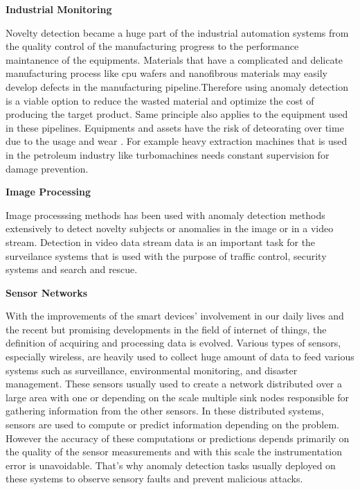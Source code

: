 \textbf{ Industrial Monitoring}

Novelty detection became a huge part of the industrial automation systems from the quality control
of the manufacturing progress to the performance maintanence of the equipments. Materials that have
a complicated and delicate manufacturing process like cpu wafers \cite{Kim:2012:MLN:2076800.2076903} and nanofibrous
materials \cite{Napoletano_2018} may easily develop defects in the manufacturing pipeline.Therefore using
anomaly detection is a viable option to reduce the wasted material and optimize the cost of
producing the target product. Same principle also applies to the equipment used in these pipelines.
Equipments and assets have the risk of deteorating over time due to the usage
and wear \cite{Pimentel:2014:RRN:2588908.2589196}. For example heavy extraction machines that is used in the
petroleum industry like turbomachines \cite{s150202774} needs constant supervision for damage
prevention. 

\textbf{ Image Processing}

Image processsing methods has been used with anomaly detection methods extensively to detect novelty
subjects or anomalies in the image or in a video stream. Detection in video data stream data is an
important task for the surveilance systems that is used with the purpose of traffic control,
security systems and search and rescue. \cite{image_anomaly} 

\textbf{ Sensor Networks}

With the improvements of the smart devices' involvement in our daily lives and the recent but promising developments
in the field of internet of things, the definition of acquiring and processing data is evolved.
Various types of sensors, especially wireless, are heavily used to collect huge amount of data to
feed various systems such as surveillance, environmental monitoring, and disaster management.
\cite{UlIslam2018} These sensors usually used to create a network distributed over a large area with
one or depending on the scale multiple sink nodes responsible for gathering information from the
other sensors. In these distributed systems, sensors are used to compute or predict information
depending on the problem. However the accuracy of these computations or predictions depends
primarily on the quality of the sensor measurements and with this scale the instrumentation error
is unavoidable. That's why anomaly detection tasks usually deployed on these systems to observe
sensory faults and prevent malicious attacks. \cite{Pimentel:2014:RRN:2588908.2589196} \cite{iot_anomaly}


